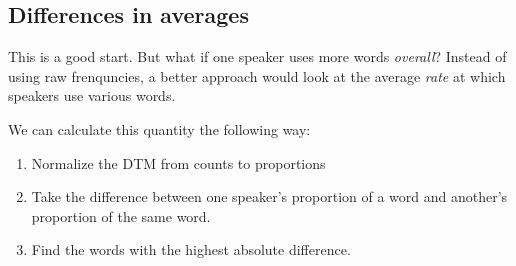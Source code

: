 \documentclass[]{book}
\providecommand{\tightlist}{%
  \setlength{\itemsep}{0pt}\setlength{\parskip}{0pt}}
\begin{document}
\hypertarget{differences-in-averages}{%
\subsection{Differences in averages}\label{differences-in-averages}}

This is a good start. But what if one speaker uses more words \emph{overall}? Instead of using raw frenquncies, a better approach would look at the average \emph{rate} at which speakers use various words.

We can calculate this quantity the following way:

\begin{enumerate}
\def\labelenumi{\arabic{enumi}.}
\tightlist
\item
  Normalize the DTM from counts to proportions
\item
  Take the difference between one speaker's proportion of a word and another's proportion of the same word.
\item
  Find the words with the highest absolute difference.
\end{enumerate}
\end{document}
